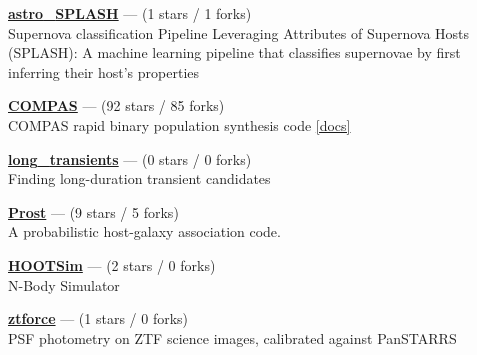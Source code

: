 \item \href{https://github.com/Adam-Boesky/astro_SPLASH}{{\bf astro{\_}SPLASH}} --- (1 stars / 1 forks) \\
Supernova classification Pipeline Leveraging Attributes of Supernova Hosts (SPLASH): A machine learning pipeline that classifies supernovae by first inferring their host's properties 

\item \href{https://github.com/TeamCOMPAS/COMPAS}{{\bf COMPAS}} --- (92 stars / 85 forks) \\
COMPAS rapid binary population synthesis code \href{http://compas.science}{[docs]}

\item \href{https://github.com/Adam-Boesky/long_transients}{{\bf long{\_}transients}} --- (0 stars / 0 forks) \\
Finding long-duration transient candidates 

\item \href{https://github.com/alexandergagliano/Prost}{{\bf Prost}} --- (9 stars / 5 forks) \\
A probabilistic host-galaxy association code.  

\item \href{https://github.com/jdinovi/HOOTSim}{{\bf HOOTSim}} --- (2 stars / 0 forks) \\
N-Body Simulator 

\item \href{https://github.com/Adam-Boesky/ztforce}{{\bf ztforce}} --- (1 stars / 0 forks) \\
PSF photometry on ZTF science images, calibrated against PanSTARRS 